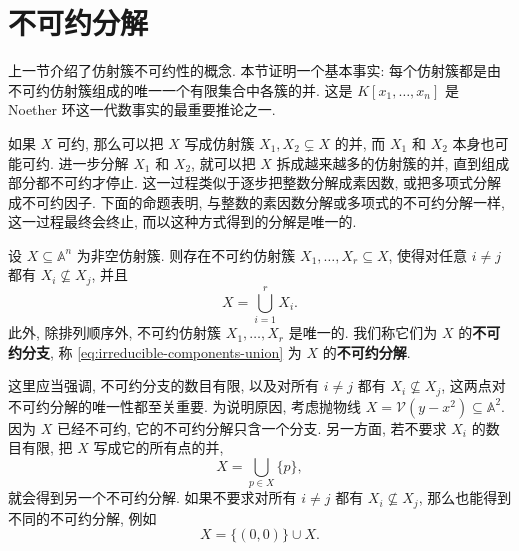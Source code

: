 \section{不可约分解}\label{sec:irreducible-decompositions}

上一节介绍了仿射簇不可约性的概念. 本节证明一个基本事实: 每个仿射簇都是由不可约仿射簇组成的唯一一个有限集合中各簇的并. 这是 $K[x_{1},\ldots,x_{n}]$ 是 Noether 环这一代数事实的最重要推论之一.

如果 $X$ 可约, 那么可以把 $X$ 写成仿射簇 $X_{1},X_{2}\subsetneq X$ 的并, 而 $X_{1}$ 和 $X_{2}$ 本身也可能可约. 进一步分解 $X_{1}$ 和 $X_{2}$, 就可以把 $X$ 拆成越来越多的仿射簇的并, 直到组成部分都不可约才停止. 这一过程类似于逐步把整数分解成素因数, 或把多项式分解成不可约因子. 下面的命题表明, 与整数的素因数分解或多项式的不可约分解一样, 这一过程最终会终止, 而以这种方式得到的分解是唯一的.

\begin{BookPropositionDefinition}[不可约分解]\leavevmode\label{prop:irreducible-decomposition}
  设 $X\subseteq\mathbb{A}^{n}$ 为非空仿射簇. 则存在不可约仿射簇 $X_{1},\ldots,X_{r}\subseteq X$, 使得对任意 $i\ne j$ 都有 $X_{i}\nsubseteq X_{j}$, 并且
  \begin{equation}\label{eq:irreducible-components-union}
    X=\bigcup_{i=1}^{r}X_{i}.
  \end{equation}
  此外, 除排列顺序外, 不可约仿射簇 $X_{1},\ldots,X_{r}$ 是唯一的. 我们称它们为 $X$ 的\textbf{不可约分支}, 称 \eqref{eq:irreducible-components-union} 为 $X$ 的\textbf{不可约分解}.
\end{BookPropositionDefinition}

这里应当强调, 不可约分支的数目有限, 以及对所有 $i\ne j$ 都有 $X_{i}\nsubseteq X_{j}$, 这两点对不可约分解的唯一性都至关重要. 为说明原因, 考虑抛物线 $X=\mathcal{V}(y-x^{2})\subseteq\mathbb{A}^{2}$. 因为 $X$ 已经不可约, 它的不可约分解只含一个分支. 另一方面, 若不要求 $X_{i}$ 的数目有限, 把 $X$ 写成它的所有点的并,
\[
  X=\bigcup_{p\in X}\{p\},
\]
就会得到另一个不可约分解. 如果不要求对所有 $i\ne j$ 都有 $X_{i}\nsubseteq X_{j}$, 那么也能得到不同的不可约分解, 例如
\[
  X=\{(0,0)\}\cup X.
\]

